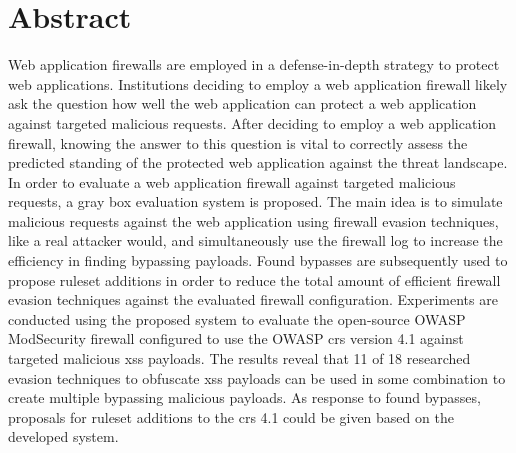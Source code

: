 \section{Abstract}
Web application firewalls are employed in a defense-in-depth strategy to protect web applications.
Institutions deciding to employ a web application firewall likely ask the question how well the web application can protect a web application against targeted malicious requests.
After deciding to employ a web application firewall, knowing the answer to this question is vital to correctly assess the predicted standing of the protected web application against the threat landscape.
In order to evaluate a web application firewall against targeted malicious requests, a gray box evaluation system is proposed. The main idea is to simulate malicious requests against the web application using firewall evasion techniques, like a real attacker would, and simultaneously use the firewall log to increase the efficiency in finding bypassing payloads.
Found bypasses are subsequently used to propose ruleset additions in order to reduce the total amount of efficient firewall evasion techniques against the evaluated firewall configuration.
Experiments are conducted using the proposed system to evaluate the open-source OWASP ModSecurity firewall configured to use the OWASP \acrfull{crs} version 4.1 against targeted malicious \acrfull{xss} payloads.
The results reveal that 11 of 18 researched evasion techniques to obfuscate \acrshort{xss} payloads can be used in some combination to create multiple bypassing malicious payloads.
As response to found bypasses, proposals for ruleset additions to the \acrshort{crs} 4.1 could be given based on the developed system.

